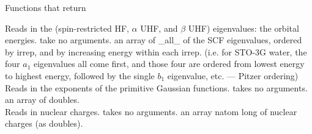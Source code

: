 \begin{center}
Functions that return 
\end{center}
{Reads in the (spin-restricted HF, $\alpha$ UHF, and $\beta$ UHF) eigenvalues:
the orbital energies.}
{take no arguments.}
{an array of \_all\_ of the SCF eigenvalues,
ordered by irrep, and by increasing energy within each irrep.
(i.e. for STO-3G water, the four $a_1$ eigenvalues all come first, and
those four are ordered from lowest energy to highest energy,
followed by the single $b_1$ eigenvalue, etc. --- Pitzer ordering)} \\
{Reads in the exponents of the primitive Gaussian functions.}
{takes no arguments.}
{an array of doubles.} \\
{Reads in nuclear charges.}
{takes no arguments.}
{an array natom long of nuclear charges (as doubles).}

